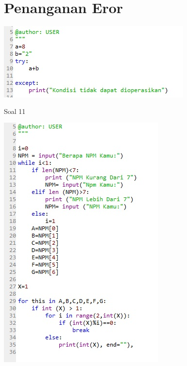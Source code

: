 \documentclass[a4paper,12pt]{report}
\begin{document}
\section{Penanganan Eror}
    \begin{center}
    \includegraphics[width=11cm\textwidth]{Figure/err.jpg}
    \end{center}
\item Soal 11
    \begin{center}
    \includegraphics[width=11cm\textwidth]{Figure/11.jpg}
    \end{center}
\end{document}
